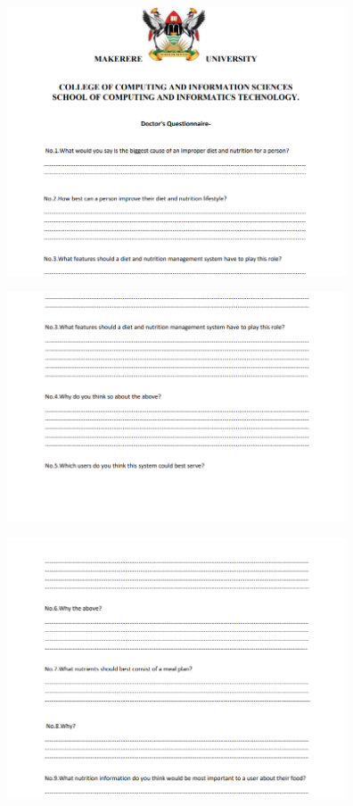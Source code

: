 \documentclass{article}
\begin{document}
\vspace{30pt}
\begin{center}

\includegraphics[width=380px]{images/doctors1.PNG}

 \includegraphics[width=380px]{images/doctors2.PNG}

\includegraphics[width=380px]{images/doctors3.PNG} 


\end{center}
\end{document}
